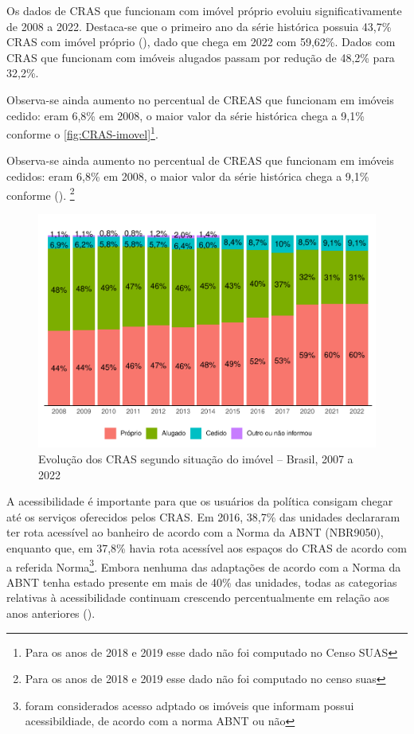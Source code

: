 \documentclass[
  brazilian]{report}
\begin{document}
Os dados de CRAS que funcionam com imóvel próprio evoluiu
significativamente de 2008 a 2022. Destaca-se que o primeiro ano da
série histórica possuia 43,7\% CRAS com imóvel próprio
(), dado que chega em 2022 com 59,62\%. Dados com
CRAS que funcionam com imóveis alugados passam por redução de 48,2\%
para 32,2\%.

Observa-se ainda aumento no percentual de CREAS que funcionam em imóveis
cedido: eram 6,8\% em 2008, o maior valor da série histórica chega a
9,1\% conforme o
\cref{fig:CRAS-imovel}\footnote{Para os anos de 2018 e 2019 esse dado não foi computado no Censo SUAS}.

Observa-se ainda aumento no percentual de CREAS que funcionam em imóveis
cedidos: eram 6,8\% em 2008, o maior valor da série histórica chega a
9,1\% conforme ().
\footnote{Para os anos de 2018 e 2019 esse dado não foi computado no censo suas}

\begin{figure}
\includegraphics{Censo-SUAS-2022_files/figure-latex/sit_imovel-1} \caption[Evolução dos CRAS segundo situação do imóvel – Brasil, 2007 a 2022]{Evolução dos CRAS segundo situação do imóvel – Brasil, 2007 a 2022}\label{fig:sit_imovel}
\end{figure}

A acessibilidade é importante para que os usuários da política consigam
chegar até os serviços oferecidos pelos CRAS. Em 2016, 38,7\% das
unidades declararam ter rota acessível ao banheiro de acordo com a Norma
da ABNT (NBR9050), enquanto que, em 37,8\% havia rota acessível aos
espaços do CRAS de acordo com a referida
Norma\footnote{foram considerados acesso adptado os imóveis que informam possui acessibildiade, de acordo com a norma ABNT ou não}.
Embora nenhuma das adaptações de acordo com a Norma da ABNT tenha estado
presente em mais de 40\% das unidades, todas as categorias relativas à
acessibilidade continuam crescendo percentualmente em relação aos anos
anteriores ().
\end{document}
